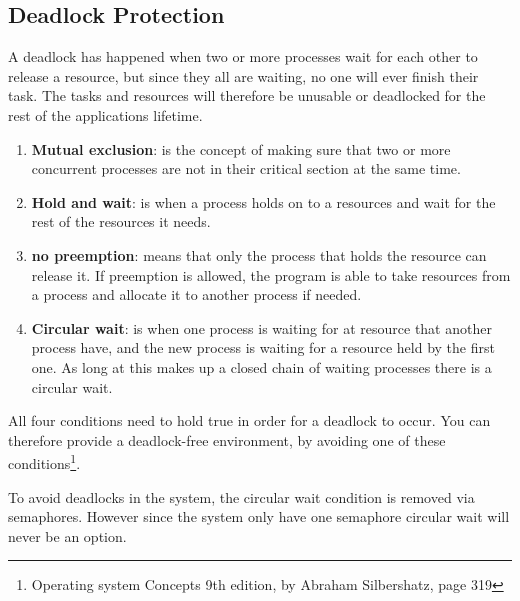 \subsection{Deadlock Protection}
\label{sec:DeadlockProtection}

A deadlock has happened when two or more processes wait for each other to release a resource, but since they all are waiting, no one will ever finish their task. The tasks and resources will therefore be unusable or deadlocked for the rest of the applications lifetime. 


\begin{enumerate}[noitemsep]
	
	\item \textbf{Mutual exclusion}: is the concept of making sure that two or more concurrent processes are not in their critical section at the same time. 
	
	\item \textbf{Hold and wait}: is when a process holds on to a resources and wait for the rest of the resources it needs.
	
	\item \textbf{no preemption}: means that only the process that holds the resource can release it. If preemption is allowed, the program is able to take resources from a process and allocate it to another process if needed.
	
	\item \textbf{Circular wait}: is when one process is waiting for at resource that another process have, and the new process is waiting for a resource held by the first one. As long at this makes up a closed chain of waiting processes there is a circular wait.

	
\end{enumerate}

All four conditions need to hold true in order for a deadlock to occur. You can therefore provide a deadlock-free environment, by avoiding one of these conditions\footnote{Operating system Concepts 9th edition, by Abraham Silbershatz, page 319}. 

To avoid deadlocks in the system, the circular wait condition is removed via semaphores. However since the system only have one semaphore circular wait will never be an option. 
